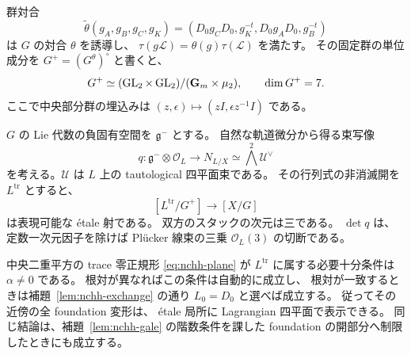 \begin{proposition}
\label{prop:noncubic-lagrangian-etale-slice}
群対合
\begin{equation}\label{eq:noncubic-group-involution}
 \widetilde\theta(g_A,g_B,g_C,g_K)
 =(D_0g_CD_0,g_K^{-t},D_0g_AD_0,g_B^{-t})
\end{equation}
は $G$ の対合 $\theta$ を誘導し、
$\tau(g\mathscr L)=\theta(g)\tau(\mathscr L)$ を満たす。
その固定群の単位成分を $G^+=(G^\theta)^\circ$ と書くと、
\[
 G^+\simeq
 (\operatorname{GL}_2\times\operatorname{GL}_2)/(\mathbf G_m\times\mu_2),
 \qquad \dim G^+=7.
\]
ここで中央部分群の埋込みは
$(z,\epsilon)\mapsto(zI,\epsilon z^{-1}I)$ である。

$G$ の Lie 代数の負固有空間を $\mathfrak g^-$ とする。
自然な軌道微分から得る束写像
\begin{equation}\label{eq:noncubic-normal-orbit-map}
 q:\mathfrak g^-\otimes\mathcal O_L
   \longrightarrow N_{L/X}
   \simeq\bigwedge^2\mathscr U^\vee
\end{equation}
を考える。$\mathscr U$ は $L$ 上の tautological 四平面束である。
その行列式の非消滅開を $L^{\mathrm{tr}}$ とすると、
\[
 [L^{\mathrm{tr}}/G^+]\longrightarrow[X/G]
 \tag{LG-slice}\label{eq:noncubic-lagrangian-stack-map}
\]
は表現可能な \texorpdfstring{\'etale}{etale} 射である。
双方のスタックの次元は三である。
$\det q$ は、定数一次元因子を除けば
Pl\"ucker 線束の三乗 $\mathcal O_L(3)$ の切断である。

中央二重平方の trace 零正規形
\eqref{eq:nchh-plane} が $L^{\mathrm{tr}}$ に属する必要十分条件は
$\alpha\ne0$ である。
根対が異なればこの条件は自動的に成立し、
根対が一致するときは補題~\ref{lem:nchh-exchange} の通り
$L_0=D_0$ と選べば成立する。
従ってその近傍の全 foundation 変形は、
\texorpdfstring{\'etale}{etale} 局所に Lagrangian 四平面で表示できる。
同じ結論は、補題~\ref{lem:nchh-gale} の階数条件を課した
foundation の開部分へ制限したときにも成立する。
\end{proposition}

